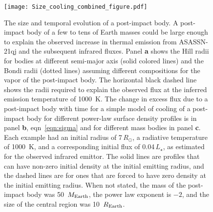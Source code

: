 \documentclass[sn-nature]{sn-jnl}%
\begin{document}




\begin{figure}
\begin{centering}
\texttt{[image: Size\_cooling\_combined\_figure.pdf]}
\caption{The size and temporal evolution of a post-impact body.
%
A post-impact body of a few to tens of Earth masses could be large enough to explain the observed increase in thermal emission from ASASSN-21qj and the subsequent infrared fluxes.
%
Panel {\bf a} shows the Hill radii for bodies at different semi-major axis (solid colored lines) and the Bondi radii (dotted lines) assuming different compositions for the vapor of the post-impact body.
%
The horizontal black dashed line shows the radii required to explain the observed flux at the inferred emission temperature of 1000~K. 
%
The change in excess flux due to a post-impact body with time for a simple model of cooling of a post-impact body for different power-law surface density profiles is in panel {\bf b}, eqn~\ref{eqn:sigma} and for different mass bodies in panel {\bf c}.
%
Each example had an initial radius of 7\,$R_\odot$, a radiative temperature of 1000~K, and a corresponding initial flux of 0.04\,$L_\star$, as estimated for the observed infrared emittor.
%
The solid lines are profiles that can have non-zero initial density at the initial emitting radius, and the dashed lines are for ones that are forced to have zero density at the initial emitting radius.
%
When not stated, the mass of the post-impact body was 50~$M_{\rm Earth}$, the power law exponent is $-2$, and the size of the central region was 10~$R_{\rm Earth}$.
}
\label{fig:Hill_Bondi_R}
\end{centering}
\end{figure}
\end{document}
